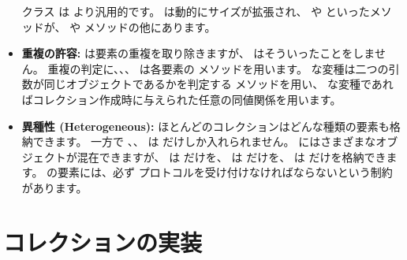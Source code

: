 \documentclass[a4paper,10pt,twoside]{book}
\begin{document}
\begin{itemize}
         クラス  は  より汎用的です。 は動的にサイズが拡張され、 や  といったメソッドが、 や  メソッドの他にあります。
  
  \item {\bf 重複の許容:}
  	 は要素の重複を取り除きますが、 はそういったことをしません。
	重複の判定に、、、 は各要素の \ct{=} メソッドを用います。 な変種は二つの引数が同じオブジェクトであるかを判定する \ct{==} メソッドを用い、 な変種であればコレクション作成時に与えられた任意の同値関係を用います。

  \item {\bf 異種性 (Heterogeneous):}
        ほとんどのコレクションはどんな種類の要素も格納できます。
        一方で 、、 は  だけしか入れられません。
         にはさまざまなオブジェクトが混在できますが、 は  だけを、 は  だけを、 は  だけを格納できます。
	 の要素には、必ず  プロトコルを受け付けなければならないという制約があります。

\end{itemize}


\section{コレクションの実装}
\end{document}
